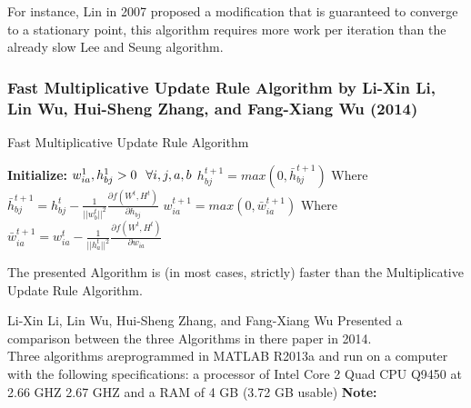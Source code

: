 \documentclass[aspectratio=169]{beamer}
\begin{document}
\begin{spacing}{1.0}
\begin{frame}
    For instance, Lin in 2007 proposed a modification that is guaranteed to converge to a stationary point,
    this algorithm requires more work per iteration than the already slow Lee and Seung algorithm.
\end{frame}
\begin{frame}
    \begin{tcolorbox}[fit,width=\textwidth,height=.85\textheight,size=minimal,colback=white,fit algorithm=fontsize,colframe=white]
\frametitle{Fast Multiplicative Update Rule Algorithm by Li-Xin Li, Lin Wu, Hui-Sheng Zhang, and Fang-Xiang Wu (2014)}
\begin{algorithm}[H]
    \caption{Fast Multiplicative Update Rule Algorithm}
        \textbf{Initialize:} $w_{ia}^{1}, h_{bj}^{1} > 0 \hspace{0.1in}\forall i,j,a,b$\;
         {
        {$h_{bj}^{t+1} = max(0, \bar{h}_{bj}^{t+1})$\;
         Where \;
         $\bar{h}_{bj}^{t+1} = h_{bj}^{t} - \frac{1}{||w_{b}^{t}||^{2}}\frac{\partial f(W^{t},H^{t})}{\partial h_{bj}}$\;
        }
        {$w_{ia}^{t+1} = max(0, \bar{w}_{ia}^{t+1})$\;
         Where \;
         $\bar{w}_{ia}^{t+1} = w_{ia}^{t} - \frac{1}{||h_{a}^{t}||^{2}}\frac{\partial f(W^{t},H^{t})}{\partial w_{ia}}$\;
        }
        }
\end{algorithm}
\end{tcolorbox}
\end{frame}
\begin{frame}
    \begin{theorem}
        The presented Algorithm is (in most cases, strictly) faster than the Multiplicative Update Rule
        Algorithm.
    \end{theorem}
\end{frame}
\begin{frame}
        Li-Xin Li, Lin Wu, Hui-Sheng Zhang, and Fang-Xiang Wu Presented a comparison between the three Algorithms
        in there paper in 2014.\\
        Three algorithms areprogrammed in MATLAB R2013a and run on a computer with the following specifications: 
        a processor of Intel Core 2 Quad CPU Q9450 at 2.66 GHZ 2.67 GHZ and a RAM of 4 GB (3.72 GB usable)
        \textbf{Note:}\\ 

\end{frame}
\end{spacing}
\end{document}
